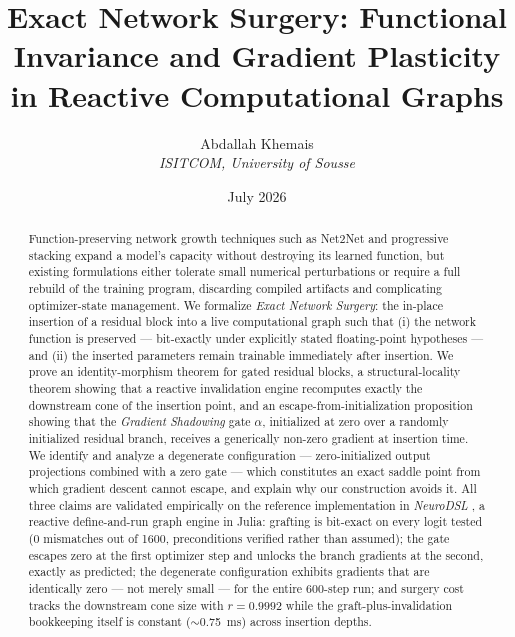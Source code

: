 \documentclass[11pt,a4paper]{article}
\begin{document}
\title{Exact Network Surgery: Functional Invariance and Gradient Plasticity in Reactive Computational Graphs}
\author{Abdallah Khemais \\ \textit{ISITCOM, University of Sousse}}
\date{July 2026}

\maketitle

\begin{abstract}
Function-preserving network growth techniques such as Net2Net \cite{net2net} and progressive stacking \cite{stacking} expand a model's capacity without destroying its learned function, but existing formulations either tolerate small numerical perturbations or require a full rebuild of the training program, discarding compiled artifacts and complicating optimizer-state management. We formalize \emph{Exact Network Surgery}: the in-place insertion of a residual block into a live computational graph such that (i) the network function is preserved --- bit-exactly under explicitly stated floating-point hypotheses --- and (ii) the inserted parameters remain trainable immediately after insertion. We prove an identity-morphism theorem for gated residual blocks, a structural-locality theorem showing that a reactive invalidation engine recomputes exactly the downstream cone of the insertion point, and an escape-from-initialization proposition showing that the \emph{Gradient Shadowing} gate $\alpha$, initialized at zero over a randomly initialized residual branch, receives a generically non-zero gradient at insertion time. We identify and analyze a degenerate configuration --- zero-initialized output projections combined with a zero gate --- which constitutes an exact saddle point from which gradient descent cannot escape, and explain why our construction avoids it. All three claims are validated empirically on the reference implementation in \emph{NeuroDSL} \cite{neurodsl}, a reactive define-and-run graph engine in Julia: grafting is bit-exact on every logit tested (0 mismatches out of 1600, preconditions verified rather than assumed); the gate escapes zero at the first optimizer step and unlocks the branch gradients at the second, exactly as predicted; the degenerate configuration exhibits gradients that are identically zero --- not merely small --- for the entire 600-step run; and surgery cost tracks the downstream cone size with $r = 0.9992$ while the graft-plus-invalidation bookkeeping itself is constant ($\sim$0.75~ms) across insertion depths.
\end{abstract}
\end{document}
